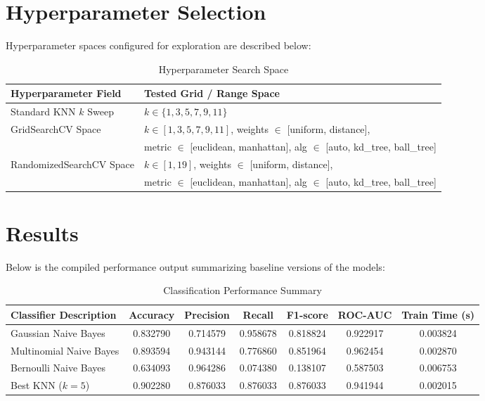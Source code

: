 \documentclass[12pt,a4paper]{article}
\begin{document}
\section{Hyperparameter Selection}
Hyperparameter spaces configured for exploration are described below:

\begin{table}[!ht]
\centering
\begin{tabular}{|l|l|}
\hline
Hyperparameter Field & Tested Grid / Range Space \\
\hline
Standard KNN $k$ Sweep & $k \in \{1, 3, 5, 7, 9, 11\}$ \\
GridSearchCV Space & $k \in [1, 3, 5, 7, 9, 11]$, weights $\in$ [uniform, distance], \\
& metric $\in$ [euclidean, manhattan], alg $\in$ [auto, kd\_tree, ball\_tree] \\
RandomizedSearchCV Space & $k \in [1, 19]$, weights $\in$ [uniform, distance], \\
& metric $\in$ [euclidean, manhattan], alg $\in$ [auto, kd\_tree, ball\_tree] \\
\hline
\end{tabular}
\caption{Hyperparameter Search Space}
\label{tab:hyper}
\end{table}

\section{Results}
Below is the compiled performance output summarizing baseline versions of the models:

\begin{table}[!ht]
\centering
\begin{tabular}{|l|c|c|c|c|c|c|}
\hline
Classifier Description & Accuracy & Precision & Recall & F1-score & ROC-AUC & Train Time (s) \\
\hline
Gaussian Naive Bayes & 0.832790 & 0.714579 & 0.958678 & 0.818824 & 0.922917 & 0.003824 \\
Multinomial Naive Bayes & 0.893594 & 0.943144 & 0.776860 & 0.851964 & 0.962454 & 0.002870 \\
Bernoulli Naive Bayes & 0.634093 & 0.964286 & 0.074380 & 0.138107 & 0.587503 & 0.006753 \\
Best KNN ($k=5$) & 0.902280 & 0.876033 & 0.876033 & 0.876033 & 0.941944 & 0.002015 \\
\hline
\end{tabular}
\caption{Classification Performance Summary}
\label{tab:res}
\end{table}
\end{document}
